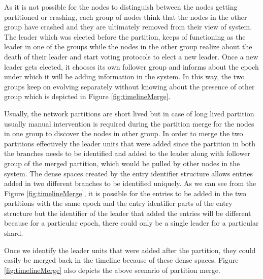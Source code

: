 \documentclass[12pt,a4paper,twoside,openright]{book}
\begin{document}
\par As it is not possible for the nodes to distinguish between the nodes getting partitioned or crashing, each group of nodes think that the nodes in the other group have crashed and they are ultimately removed from their view of system. The leader which was elected before the partition, keeps of functioning as the leader in one of the groups while the nodes in the other group realize about the death of their leader and start voting protocols to elect a new leader. Once a new leader gets elected, it chooses its own follower group and informs about the epoch under which it will be adding information in the system. In this way, the two groups keep on evolving separately without knowing about the presence of other group which is depicted in Figure \ref{fig:timelineMerge}.

\par Usually, the network partitions are short lived but in case of long lived partition usually manual intervention is required during the partition merge for the nodes in one group to discover the nodes in other group. In order to merge the two partitions effectively the leader units that were added since the partition in both the branches needs to be identified and added to the leader along with follower group of the merged partition, which would be pulled by other nodes in the system. The dense spaces created by the entry identifier structure allows entries added in two different branches to be identified uniquely. As we can see from the Figure \ref{fig:timelineMerge}, it is possible for the entries to be added in the two partitions with the same epoch and the entry identifier parts of the entry structure but the identifier of the leader that added the entries will be different because for a particular epoch, there could only be a single leader for a particular shard.

\par Once we identify the leader units that were added after the partition, they could easily be merged back in the timeline because of these dense spaces. Figure \ref{fig:timelineMerge} also depicts the above scenario of partition merge.
\end{document}
